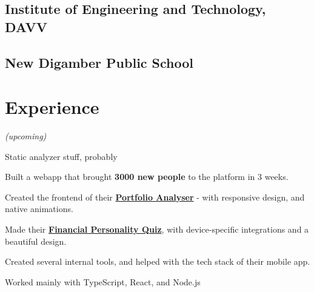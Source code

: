 \documentclass[]{resume}
\begin{document}
\begin{minipage}[t]{0.35\textwidth}
\subsection{Institute of Engineering and Technology, DAVV}
\sectionsep

\subsection{New Digamber Public School}
\sectionsep
\sectionsep

%
%

\end{minipage} 
\hfill
\begin{minipage}[t]{0.62\textwidth} 


\section{Experience}
\emph{(upcoming)}
\vspace{\topsep} %
\begin{tightemize}
\item Static analyzer stuff, probably
\end{tightemize}
\sectionsep

\begin{tightemize}
\item Built a webapp that brought \textbf{3000 new people} to the platform in 3 weeks.
\item Created the frontend of their  \href{https://jupiter.money/portfolio-analyser}{\textbf{Portfolio Analyser}} - with responsive design, and native animations.
\item Made their \href{https://jupiter.money/quiz}{\textbf{Financial Personality Quiz}}, with device-specific integrations and a beautiful design.
\item Created several internal tools, and helped with the tech stack of their mobile app.
\item Worked mainly with TypeScript, React, and Node.js
\end{tightemize}
\sectionsep


\end{minipage}
\end{document}
